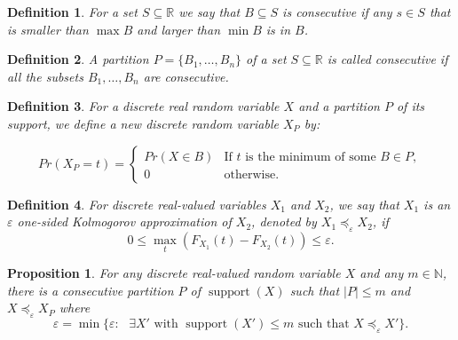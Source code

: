 \documentclass[review]{elsarticle}
\newtheorem{definition}{Definition}
\newtheorem{proposition}{Proposition}
\DeclareMathOperator{\supp}{support}
\begin{document}
\begin{definition}\label{consecutive} For a set $S \subseteq \mathbb{R}$ we say that
$B \subseteq S$ is \emph{consecutive} if any $s\in S$ that is smaller than $\max B$ and larger than $\min B$ is in $B$.
\end{definition}

\begin{definition}\label{part_consecutive} A partition $P=\{B_1,\dots,B_n\}$ of a set $S \subseteq \mathbb{R}$ is called 
\emph{consecutive} if all the subsets $B_1 ,\dots,B_n$ are consecutive.
\end{definition}


\begin{definition}\label{partition}
	For a discrete real random variable $X$ and a partition $P$ of its support, we define a new discrete random variable $X_P$ by:
	
	$$Pr(X_P = t) = \begin{cases} 
	Pr(X\in B) & \text{If $t$ is the minimum of some } B \in P, \\
	0      & \text{otherwise.}
	\end{cases}$$
\end{definition}


\begin{definition}
	For discrete real-valued variables $X_1$ and $X_2$, we say that $X_1$ is an $\varepsilon$ one-sided Kolmogorov approximation of $X_2$, denoted by 
	$X_1 \preceq_\varepsilon X_2$, if $$0 \leq  \max\limits_{t} (F_{X_1}(t)-F_{X_2}(t)) \leq \varepsilon.$$
\end{definition}

\begin{proposition}
	For any discrete real-valued random variable $X$ and any $m \in \mathbb{N}$, there is a consecutive partition $P$ of $\supp(X)$ such that $|P|\leq m$ and
	$X \preceq_\varepsilon X_P$ 
	where $$ \varepsilon = \min\{ \varepsilon \colon \text{ $\exists X'$ with $\supp(X')\leq m$ such that $X \preceq_\varepsilon X'$}\}.$$
\end{proposition}


\end{document}
